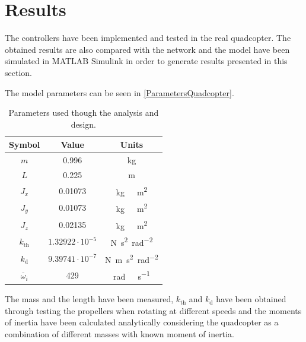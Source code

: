 \section{Results}\label{sec:results}
The controllers have been implemented and tested in the real quadcopter. The obtained results are also compared with the network and the model have been simulated in MATLAB Simulink in order to generate results presented in this section. 

The model parameters can be seen in \autoref{ParametersQuadcopter}. 
\begin{table}[H]
    \centering
    \begin{tabular}{c|c|c}
        \textbf{Symbol} &\textbf{Value} &\textbf{Units}\\
        \hline %
        $m$ & 0.996       &kg\\
        \hline %
        $L$  &   0.225       & m\\
        \hline %
        $J_x$  & 0.01073       & \si{kg \  m^2}\\
        \hline %
        $J_y$  & 0.01073       & \si{kg \  m^2}\\
        \hline %
        $J_z$  & 0.02135       & \si{kg \  m^2}\\
        \hline %
        $k_{\mathrm{th}}$  & $1.32922\cdot10^{-5}$       & \si{N s^2 rad^{-2}}\\
        \hline %
        $k_{\mathrm{d}}$  & $9.39741 \cdot10^{-7}$       & \si{N m s^2  rad^{-2}}\\
        \hline %
        $\overline{\omega}_i$& 429      & \si{rad \ s^{-1}}\\
        
    \end{tabular}
    \caption{Parameters used though the analysis and design.}
    \label{ParametersQuadcopter}
\end{table}
The mass and the length have been measured, $k_{\mathrm{th}}$ and $k_{\mathrm{d}}$ have been obtained through testing the propellers when rotating at different speeds and the moments of inertia have been calculated analytically considering the quadcopter as a combination of different masses with known moment of inertia.

